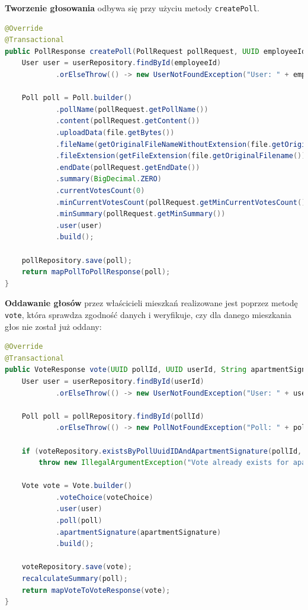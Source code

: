 \noindent \textbf{Tworzenie głosowania} odbywa się przy użyciu metody \texttt{createPoll}.
\begin{lstlisting}[language=Java, style=JavaStyle, caption=Fragment metody \texttt{createPoll}]
@Override
@Transactional
public PollResponse createPoll(PollRequest pollRequest, UUID employeeId, MultipartFile file) throws UserNotFoundException, IOException {
    User user = userRepository.findById(employeeId)
            .orElseThrow(() -> new UserNotFoundException("User: " + employeeId + " not found"));

    Poll poll = Poll.builder()
            .pollName(pollRequest.getPollName())
            .content(pollRequest.getContent())
            .uploadData(file.getBytes())
            .fileName(getOriginalFileNameWithoutExtension(file.getOriginalFilename()))
            .fileExtension(getFileExtension(file.getOriginalFilename()))
            .endDate(pollRequest.getEndDate())
            .summary(BigDecimal.ZERO)
            .currentVotesCount(0)
            .minCurrentVotesCount(pollRequest.getMinCurrentVotesCount())
            .minSummary(pollRequest.getMinSummary())
            .user(user)
            .build();

    pollRepository.save(poll);
    return mapPollToPollResponse(poll);
}
\end{lstlisting}

\noindent \textbf{Oddawanie głosów} przez właścicieli mieszkań realizowane jest poprzez metodę \texttt{vote}, która sprawdza zgodność danych i weryfikuje, czy dla danego mieszkania głos nie został już oddany:
\begin{lstlisting}[language=Java, style=JavaStyle, caption=Fragment metody \texttt{vote}]
@Override
@Transactional
public VoteResponse vote(UUID pollId, UUID userId, String apartmentSignature, VoteChoice voteChoice) throws UserNotFoundException, PollNotFoundException, ApartmentNotFoundException {
    User user = userRepository.findById(userId)
            .orElseThrow(() -> new UserNotFoundException("User: " + userId + " not found"));

    Poll poll = pollRepository.findById(pollId)
            .orElseThrow(() -> new PollNotFoundException("Poll: " + pollId + " not found"));

    if (voteRepository.existsByPollUuidIDAndApartmentSignature(pollId, apartmentSignature))
        throw new IllegalArgumentException("Vote already exists for apartment");

    Vote vote = Vote.builder()
            .voteChoice(voteChoice)
            .user(user)
            .poll(poll)
            .apartmentSignature(apartmentSignature)
            .build();

    voteRepository.save(vote);
    recalculateSummary(poll);
    return mapVoteToVoteResponse(vote);
}
\end{lstlisting}


